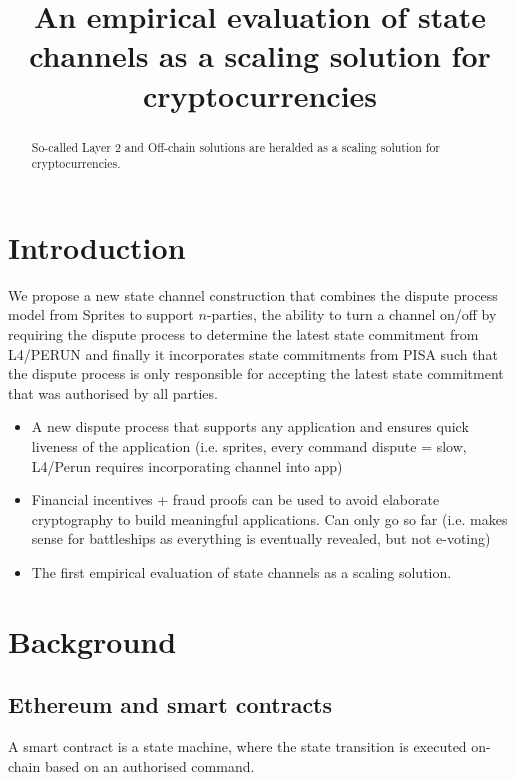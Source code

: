 \documentclass{llncs}
\begin{document}
	\title{An empirical evaluation of state channels as a scaling solution for cryptocurrencies}
	\maketitle
	\begin{abstract}
		So-called Layer 2 and Off-chain solutions are heralded as a scaling solution for cryptocurrencies. 
	\end{abstract} 

\section{Introduction}

We propose a new state channel construction that combines the dispute process model from Sprites to support $n$-parties, the ability to turn a channel on/off by requiring the dispute process to determine the latest state commitment from L4/PERUN and finally it incorporates state commitments from PISA such that the dispute process is only responsible for accepting the latest state commitment that was authorised by all parties. 


\begin{itemize}
\item A new dispute process that supports any application and ensures quick liveness of the application (i.e. sprites, every command dispute = slow, L4/Perun requires incorporating channel into app)
\item Financial incentives + fraud proofs can be used to avoid elaborate cryptography to build meaningful applications. Can only go so far (i.e. makes sense for battleships as everything is eventually revealed, but not e-voting) 
\item The first empirical evaluation of state channels as a scaling solution. 

\end{itemize}
\section{Background}

\subsection{Ethereum and smart contracts}


A smart contract is a state machine, where the state transition is executed on-chain based on an authorised command. 
\end{document}
